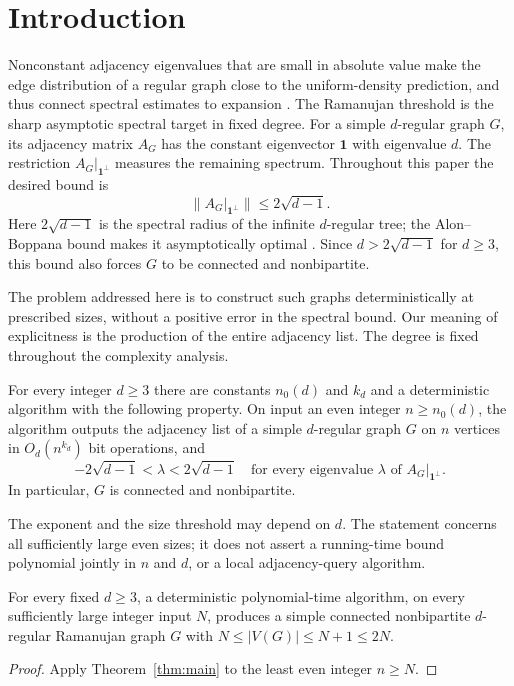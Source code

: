 \section{Introduction}\label{sec:introduction}

Nonconstant adjacency eigenvalues that are small in absolute value make the edge distribution of a
regular graph close to the uniform-density prediction, and thus connect
spectral estimates to expansion \cite{Alon1986}.
The Ramanujan threshold is the sharp asymptotic spectral target in fixed
degree. For a simple $d$-regular graph $G$, its adjacency
matrix $A_G$ has the constant eigenvector $\mathbf1$ with eigenvalue $d$.
The restriction $A_G|_{\mathbf1^\perp}$ measures the remaining spectrum.
Throughout this paper the desired bound is
\[
 \bigl\|A_G|_{\mathbf1^\perp}\bigr\|\le 2\sqrt{d-1}.
\]
Here $2\sqrt{d-1}$ is the spectral radius of the infinite $d$-regular
tree; the Alon--Boppana bound makes it asymptotically optimal
\cite{Alon1986,Nilli1991}. Since $d>2\sqrt{d-1}$ for $d\ge3$, this bound
also forces $G$ to be connected and nonbipartite.

The problem addressed here is to construct such graphs deterministically
at prescribed sizes, without a positive error in the spectral bound.
Our meaning of explicitness is the production of the entire adjacency
list. The degree is fixed throughout the complexity analysis.

\begin{theorem}\label{thm:main}
For every integer $d\ge3$ there are constants $n_0(d)$ and $k_d$ and a
deterministic algorithm with the following property. On input an even
integer $n\ge n_0(d)$, the algorithm outputs the adjacency list of a simple
$d$-regular graph $G$ on $n$ vertices in $O_d(n^{k_d})$ bit operations, and
\[
 -2\sqrt{d-1}<\lambda<2\sqrt{d-1}
 \quad\text{for every eigenvalue $\lambda$ of }A_G|_{\mathbf1^\perp}.
\]
In particular, $G$ is connected and nonbipartite.
\end{theorem}

The exponent and the size threshold may depend on $d$. The statement
concerns all sufficiently large even sizes; it does not assert a
running-time bound polynomial jointly in $n$ and $d$, or a local
adjacency-query algorithm.

\begin{corollary}\label{cor:target-size}
For every fixed $d\ge3$, a deterministic polynomial-time algorithm,
on every sufficiently large integer input $N$, produces a simple
connected nonbipartite $d$-regular Ramanujan graph $G$ with
$N\le |V(G)|\le N+1\le2N$.
\end{corollary}
\begin{proof}
Apply Theorem~\ref{thm:main} to the least even integer $n\ge N$.
\end{proof}

